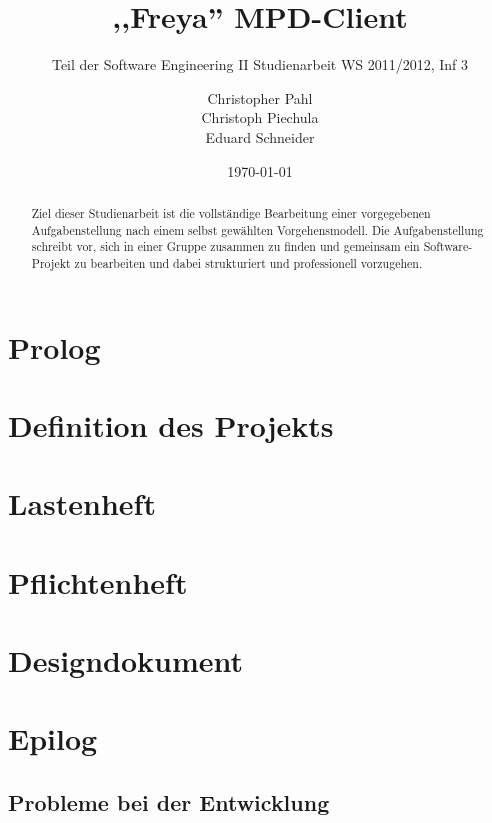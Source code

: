 \documentclass[11pt]{scrreprt}
\title{,,Freya'' MPD-Client}
\subtitle{Teil der Software Engineering II Studienarbeit WS 2011/2012, Inf 3}
\author{
Christopher Pahl\\
Christoph Piechula\\
Eduard Schneider
}
\date{\today}
\begin{document}
\maketitle
\part{Prolog}
\begin{abstract}
Ziel dieser Studienarbeit ist die vollständige Bearbeitung einer vorgegebenen Aufgabenstellung
nach einem selbst gewählten Vorgehensmodell. Die Aufgabenstellung schreibt vor, sich in einer
Gruppe zusammen zu finden und gemeinsam ein Software-Projekt zu bearbeiten und dabei strukturiert
und professionell vorzugehen.
\end{abstract}

\tableofcontents

\part{Definition des Projekts}




\part{Lastenheft}

\part{Pflichtenheft}


\part{Designdokument}







\part{Epilog}
\chapter{Probleme bei der Entwicklung}
\end{document}
